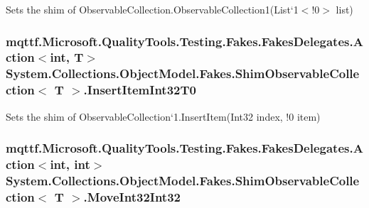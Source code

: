 Sets the shim of Observable\-Collection{.\-Observable\-Collection}1(List`1$<$!0$>$ list)

\hypertarget{class_system_1_1_collections_1_1_object_model_1_1_fakes_1_1_shim_observable_collection_3_01_t_01_4_a84b0154e88936d225c98fbf24a733bef}{
\subsubsection[{Insert\-Item\-Int32\-T0}]{\setlength{\rightskip}{0pt plus 5cm}mqttf.\-Microsoft.\-Quality\-Tools.\-Testing.\-Fakes.\-Fakes\-Delegates.\-Action$<$int, T$>$ System.\-Collections.\-Object\-Model.\-Fakes.\-Shim\-Observable\-Collection$<$ T $>$.Insert\-Item\-Int32\-T0\hspace{0.3cm}{\ttfamily [set]}}}\label{class_system_1_1_collections_1_1_object_model_1_1_fakes_1_1_shim_observable_collection_3_01_t_01_4_a84b0154e88936d225c98fbf24a733bef}


Sets the shim of Observable\-Collection`1.Insert\-Item(Int32 index, !0 item)

\hypertarget{class_system_1_1_collections_1_1_object_model_1_1_fakes_1_1_shim_observable_collection_3_01_t_01_4_af41cc5dbebf1e5155380945f91a09654}{
\subsubsection[{Move\-Int32\-Int32}]{\setlength{\rightskip}{0pt plus 5cm}mqttf.\-Microsoft.\-Quality\-Tools.\-Testing.\-Fakes.\-Fakes\-Delegates.\-Action$<$int, int$>$ System.\-Collections.\-Object\-Model.\-Fakes.\-Shim\-Observable\-Collection$<$ T $>$.Move\-Int32\-Int32\hspace{0.3cm}{\ttfamily [set]}}}\label{class_system_1_1_collections_1_1_object_model_1_1_fakes_1_1_shim_observable_collection_3_01_t_01_4_af41cc5dbebf1e5155380945f91a09654}


